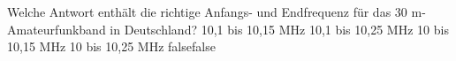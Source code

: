     {Welche Antwort enthält die richtige Anfangs- und Endfrequenz für das 30 m-Amateurfunkband in Deutschland?}
    {10,1 bis 10,15 MHz}
    {10,1 bis 10,25 MHz}
    {10 bis 10,15 MHz}
    {10 bis 10,25 MHz}
    {false}{false}